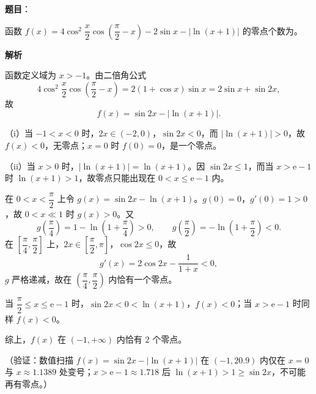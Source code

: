 \begin{answer}

\textbf{题目}：

函数 \(f(x)=4\cos^2\dfrac{x}{2}\cos\left(\dfrac{\pi}{2}-x\right)-2\sin x-|\ln(x+1)|\) 的零点个数为\gkblank{}。

\textbf{解析}

函数定义域为 \(x>-1\)。由二倍角公式
\nopagebreak[4]
\[
4\cos^2\dfrac{x}{2}\cos\left(\dfrac{\pi}{2}-x\right)
=2(1+\cos x)\sin x
=2\sin x+\sin2x,
\]
故
\nopagebreak[4]
\[
f(x)=\sin2x-|\ln(x+1)|.
\]

（i）当 \(-1<x<0\) 时，\(2x\in(-2,0)\)，\(\sin2x<0\)，而 \(|\ln(x+1)|>0\)，故 \(f(x)<0\)，无零点；\(x=0\) 时 \(f(0)=0\)，是一个零点。

（ii）当 \(x>0\) 时，\(|\ln(x+1)|=\ln(x+1)\)。因 \(\sin2x\leqslant1\)，而当 \(x>\mathrm{e}-1\) 时 \(\ln(x+1)>1\)，故零点只能出现在 \(0<x\leqslant\mathrm{e}-1\) 内。

在 \(0<x<\dfrac{\pi}{2}\) 上令 \(g(x)=\sin2x-\ln(x+1)\)。\(g(0)=0\)，\(g'(0)=1>0\)，故 \(0<x\ll1\) 时 \(g(x)>0\)。又
\nopagebreak[4]
\[
g\left(\dfrac{\pi}{4}\right)=1-\ln\left(1+\dfrac{\pi}{4}\right)>0,\qquad
g\left(\dfrac{\pi}{2}\right)=-\ln\left(1+\dfrac{\pi}{2}\right)<0.
\]
在 \(\left[\dfrac{\pi}{4},\dfrac{\pi}{2}\right]\) 上，\(2x\in\left[\dfrac{\pi}{2},\pi\right]\)，\(\cos2x\leqslant0\)，故
\nopagebreak[4]
\[
g'(x)=2\cos2x-\dfrac{1}{1+x}<0,
\]
\(g\) 严格递减，故在 \(\left(\dfrac{\pi}{4},\dfrac{\pi}{2}\right)\) 内恰有一个零点。

当 \(\dfrac{\pi}{2}\leqslant x\leqslant\mathrm{e}-1\) 时，\(\sin2x<0<\ln(x+1)\)，\(f(x)<0\)；当 \(x>\mathrm{e}-1\) 时同样 \(f(x)<0\)。

综上，\(f(x)\) 在 \((-1,+\infty)\) 内恰有 \(2\) 个零点。

（验证：数值扫描 \(f(x)=\sin2x-|\ln(x+1)|\) 在 \((-1,20.9)\) 内仅在 \(x=0\) 与 \(x\approx1.1389\) 处变号；\(x>\mathrm{e}-1\approx1.718\) 后 \(\ln(x+1)>1\geqslant\sin2x\)，不可能再有零点。）


\end{answer}
